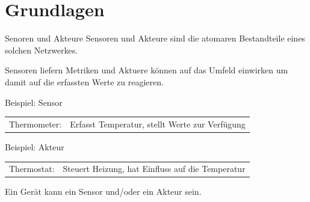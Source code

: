 \documentclass[12pt, pdf, xcolor={table, dvipsnames}, paperheight=8cm,paperwidth=12cm]{beamer}
\begin{document}
\section{Grundlagen}

\begin{frame}{Senoren und Akteure}
	Sensoren und Akteure sind die atomaren Bestandteile eines solchen Netzwerkes.
	
	\vspace{1em}
	Sensoren liefern Metriken und Aktuere können auf das Umfeld einwirken um damit auf die erfassten Werte zu reagieren.
	\begin{block}{Beispiel: Sensor}
		\vspace{0.5em}
		\begin{tabularx}{\linewidth}{lX}Thermometer: & Erfasst Temperatur, stellt Werte zur  Verfügung
		\end{tabularx}
	\end{block}
	\begin{block}{Beispiel: Akteur}
	\vspace{0.5em}
	\begin{tabularx}{\linewidth}{lX}Thermostat: &Steuert Heizung, hat Einfluss auf die Temperatur
	\end{tabularx}
	\end{block}
Ein Gerät kann ein Sensor und/oder ein Akteur sein.
\end{frame}
\end{document}
